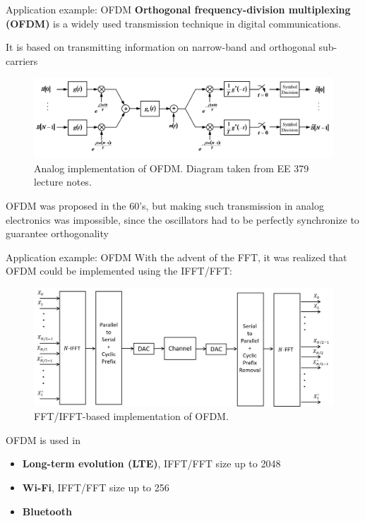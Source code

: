 \documentclass[10pt, handout]{beamer}
\begin{document}
%
\begin{frame}{Application example: OFDM}
\textbf{Orthogonal frequency-division multiplexing (OFDM)} is a widely used transmission technique in digital communications.

It is based on transmitting information on narrow-band and orthogonal sub-carriers

\begin{figure}
	\centering
	\includegraphics[scale=0.3]{figs/analog_ofdm.png}\\
	{\color{gray} \small Analog implementation of OFDM. Diagram taken from EE 379 lecture notes.}
\end{figure}

OFDM was proposed in the 60's, but making such transmission in analog electronics was impossible, since the oscillators had to be perfectly synchronize to guarantee orthogonality
\end{frame}


%
\begin{frame}{Application example: OFDM}
With the advent of the FFT, it was realized that OFDM could be implemented using the IFFT/FFT:

\begin{figure}
	\centering
	\includegraphics[scale=0.4]{figs/ofdm_diagram_fft.png}\\
	{\color{gray} \small FFT/IFFT-based implementation of OFDM.}
\end{figure}


OFDM is used in
\begin{itemize}
	\item \textbf{Long-term evolution (LTE)}, IFFT/FFT size up to 2048
	\item \textbf{Wi-Fi}, IFFT/FFT size up to 256
	\item \textbf{Bluetooth}
\end{itemize} 
\end{frame}
\end{document}
